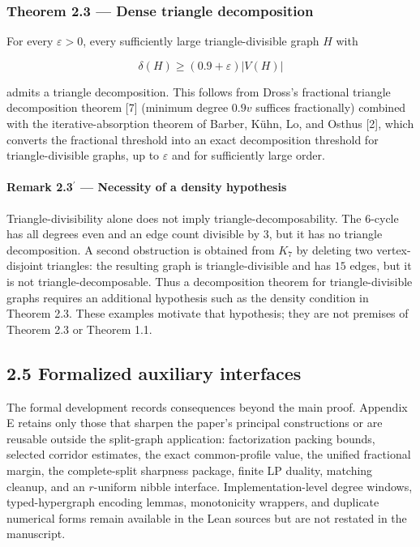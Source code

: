\documentclass[english,11pt,a4paper]{article}
\begin{document}
\subsubsection{Theorem 2.3 --- Dense triangle
decomposition}\label{theorem-2.3-dense-triangle-decomposition}

For every \(\varepsilon>0\), every sufficiently large triangle-divisible
graph \(H\) with

\[
\delta(H)\ge(0.9+\varepsilon)|V(H)|
\]

admits a triangle decomposition. This follows from Dross's fractional
triangle decomposition theorem {[}7{]} (minimum degree \(0.9v\) suffices
fractionally) combined with the iterative-absorption theorem of Barber,
Kühn, Lo, and Osthus {[}2{]}, which converts the fractional threshold
into an exact decomposition threshold for triangle-divisible graphs, up
to \(\varepsilon\) and for sufficiently large order.

\paragraph{\texorpdfstring{Remark 2.3\(^{\prime}\) --- Necessity of a
density
hypothesis}{Remark 2.3\^{}\{\textbackslash prime\} --- Necessity of a density hypothesis}}\label{remark-2.3prime-necessity-of-a-density-hypothesis}

Triangle-divisibility alone does not imply triangle-decomposability. The
6-cycle has all degrees even and an edge count divisible by \(3\), but
it has no triangle decomposition. A second obstruction is obtained from
\(K_7\) by deleting two vertex-disjoint triangles: the resulting graph
is triangle-divisible and has \(15\) edges, but it is not
triangle-decomposable. Thus a decomposition theorem for
triangle-divisible graphs requires an additional hypothesis such as the
density condition in Theorem 2.3. These examples motivate that
hypothesis; they are not premises of Theorem 2.3 or Theorem 1.1.

\subsection{2.5 Formalized auxiliary
interfaces}\label{formalized-auxiliary-interfaces}

The formal development records consequences beyond the main proof.
Appendix E retains only those that sharpen the paper's principal
constructions or are reusable outside the split-graph application:
factorization packing bounds, selected corridor estimates, the exact
common-profile value, the unified fractional margin, the complete-split
sharpness package, finite LP duality, matching cleanup, and an
\(r\)-uniform nibble interface. Implementation-level degree windows,
typed-hypergraph encoding lemmas, monotonicity wrappers, and duplicate
numerical forms remain available in the Lean sources but are not
restated in the manuscript.
\end{document}
